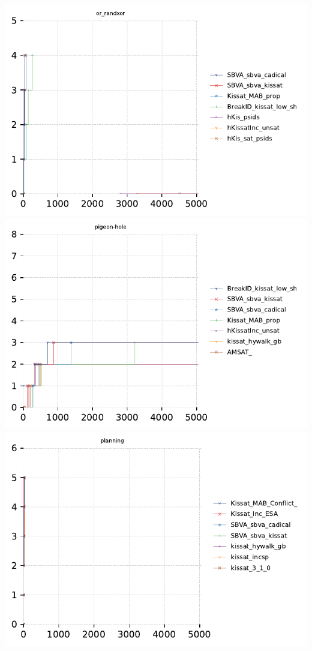 \documentclass{article}
\begin{document}
\includegraphics[width=\linewidth]{gen/sc2023/cdfs/cdf-or_randxor.pdf}
\includegraphics[width=\linewidth]{gen/sc2023/cdfs/cdf-pigeon-hole.pdf}
\includegraphics[width=\linewidth]{gen/sc2023/cdfs/cdf-planning.pdf}
\end{document}
